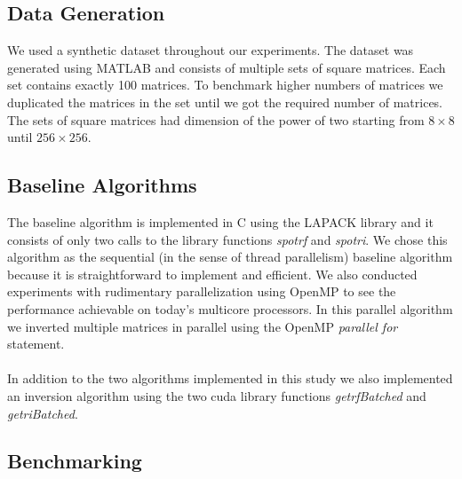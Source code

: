 \documentclass[11pt]{article}
\begin{document}
\subsection{Data Generation}

We used a synthetic dataset throughout our experiments. The dataset was generated using MATLAB and consists of multiple sets of square matrices. Each set contains exactly 100 matrices. To benchmark higher numbers of matrices we duplicated the matrices in the set until we got the required number of matrices. The sets of square matrices had dimension of the power of two starting from $8 \times 8$ until $256 \times 256$.

\subsection{Baseline Algorithms}

The baseline algorithm is implemented in C using the LAPACK library and it consists of only two calls to the library functions {\it spotrf} and {\it spotri}. We chose this algorithm as the sequential (in the sense of thread parallelism) baseline algorithm because it is straightforward to implement and efficient. We also conducted experiments with rudimentary parallelization using OpenMP to see the performance achievable on today's multicore processors. In this parallel algorithm we inverted multiple matrices in parallel using the OpenMP \textit{parallel for} statement.\\\\
In addition to the two algorithms implemented in this study we also implemented an inversion algorithm using the two cuda library functions {\it getrfBatched} and {\it getriBatched}.

\subsection{Benchmarking}
\end{document}
